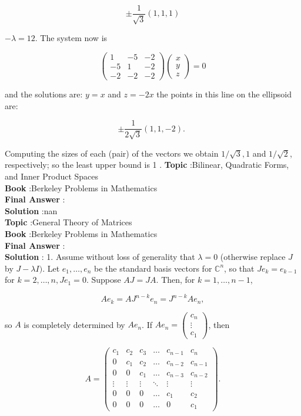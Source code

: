 \documentclass[10pt]{article}
\begin{document}
$$
\pm \frac{1}{\sqrt{3}}(1,1,1)
$$

$-\lambda=12$. The system now is

$$
\left(\begin{array}{rrr}
1 & -5 & -2 \\
-5 & 1 & -2 \\
-2 & -2 & -2
\end{array}\right)\left(\begin{array}{l}
x \\
y \\
z
\end{array}\right)=0
$$

and the solutions are: $y=x$ and $z=-2 x$ the points in this line on the ellipsoid are:

$$
\pm \frac{1}{2 \sqrt{3}}(1,1,-2) \text {. }
$$

Computing the sizes of each (pair) of the vectors we obtain $1 / \sqrt{3}, 1$ and $1 / \sqrt{2}$, respectively; so the least upper bound is 1 .
\textbf{Topic} :Bilinear, Quadratic Forms, and Inner Product Spaces \\
\textbf{Book} :Berkeley Problems in Mathematics\\
\textbf{Final Answer} :\\


\textbf{Solution} :nan\\
\textbf{Topic} :General Theory of Matrices \\
\textbf{Book} :Berkeley Problems in Mathematics\\
\textbf{Final Answer} :\\


\textbf{Solution} : 1. Assume without loss of generality that $\lambda=0$ (otherwise replace $J$ by $J-\lambda I)$. Let $e_{1}, \ldots, e_{n}$ be the standard basis vectors for $\mathbb{C}^{n}$, so that $J e_{k}=e_{k-1}$ for $k=2, \ldots, n, J e_{1}=0$. Suppose $A J=J A$. Then, for $k=1, \ldots, n-1$,

$$
A e_{k}=A J^{n-k} e_{n}=J^{n-k} A e_{n},
$$

so $A$ is completely determined by $A e_{n}$. If $A e_{n}=\left(\begin{array}{c}c_{n} \\ \vdots \\ c_{1}\end{array}\right)$, then

$$
A=\left(\begin{array}{cccccc}
c_{1} & c_{2} & c_{3} & \ldots & c_{n-1} & c_{n} \\
0 & c_{1} & c_{2} & \ldots & c_{n-2} & c_{n-1} \\
0 & 0 & c_{1} & \ldots & c_{n-3} & c_{n-2} \\
\vdots & \vdots & \vdots & \ddots & \vdots & \vdots \\
0 & 0 & 0 & \ldots & c_{1} & c_{2} \\
0 & 0 & 0 & \ldots & 0 & c_{1}
\end{array}\right) .
$$
\end{document}
